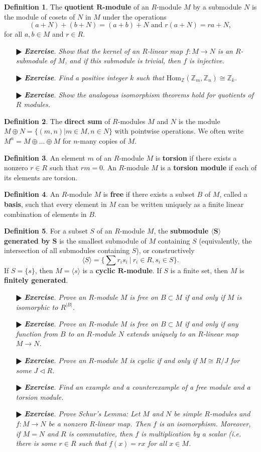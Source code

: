 \documentclass[11pt]{amsart}
\theoremstyle{definition}
\newtheorem*{definition*}{Definition}
\renewcommand\:{\colon}
\newcommand{\Z}{\mathds{Z}}
\newcommand{\1}{\mathds{1}}
\newcommand{\Hom}{\text{Hom}}
\newcommand{\exc}[1]{\vspace{-2.5pt}\begin{itemize}[leftmargin=15pt]\item[$\RHD$] \textit{\textbf{Exercise}. #1}\end{itemize}}
\begin{document}
\begin{definition*}
	The \textbf{quotient $\boldsymbol{R}$-module} of an $R$-module $M$ by a submodule $N$ is the module of cosets of $N$ in $M$ under the operations
		\[ (a + N) + (b + N) = (a + b) + N \text{ and } r(a + N) = ra + N, \]
	for all $a, b \in M$ and $r \in R$.
\end{definition*}

\exc{Show that the kernel of an $R$-linear map $f\: M \to N$ is an $R$-submodule of $M$, and if this submodule is trivial, then $f$ is injective.}
\exc{Find a positive integer $k$ such that $\Hom_\Z(\Z_m, \Z_n) \cong \Z_k$.}
\exc{Show the analogous isomorphism theorems hold for quotients of $R$ modules.}

\begin{definition*}
	The \textbf{direct sum} of $R$-modules $M$ and $N$ is the module $M \oplus N = \{(m, n) | m \in M, n \in N\}$ with pointwise operations. We often write $M^n = M \oplus \dots \oplus M$ for $n$-many copies of $M$.
\end{definition*}

\begin{definition*}
	An element $m$ of an $R$-module $M$ is \textbf{torsion} if there exists a nonzero $r \in R$ such that $rm = 0$. An $R$-module $M$ is a \textbf{torsion module} if each of its elements are torsion.
\end{definition*}

\begin{definition*}
	An $R$-module $M$ is \textbf{free} if there exists a subset $B$ of $M$, called a \textbf{basis}, such that every element in $M$ can be written uniquely as a finite linear combination of elements in $B$.
\end{definition*}

\begin{definition*}
	For a subset $S$ of an $R$-module $M$, the \textbf{submodule $\boldsymbol{\langle S \rangle}$ generated by $\boldsymbol{S}$} is the smallest submodule of $M$ containing $S$ (equivalently, the intersection of all submodules containing $S$), or constructively
		\[ \langle S \rangle = \Big\{ \sum r_is_i \ \Big| \ r_i \in R, s_i \in S \Big\}. \]
	If $S = \{s\}$, then $M = \langle s \rangle$ is a \textbf{cyclic $\boldsymbol{R}$-module}. If $S$ is a finite set, then $M$ is \textbf{finitely generated}.
\end{definition*}

\exc{Prove an $R$-module $M$ is free on $B \subset M$ if and only if $M$ is isomorphic to $R^{|B|}$.}
\exc{Prove an $R$-module $M$ is free on $B \subset M$ if and only if any function from $B$ to an $R$-module $N$ extends uniquely to an $R$-linear map $M \to N$.}
\exc{Prove an $R$-module $M$ is cyclic if and only if $M \cong R/J$ for some $J \triangleleft R$.}
\exc{Find an example and a counterexample of a free module and a torsion module.}
\exc{Prove Schur's Lemma: Let $M$ and $N$ be simple $R$-modules and $f\: M \to N$ be a nonzero $R$-linear map. Then $f$ is an isomorphism. Moreover, if $M = N$ and $R$ is commutative, then $f$ is multiplication by a scalar (i.e. there is some $r \in R$ such that $f(x) = rx$ for all $x \in M$.}
\end{document}
